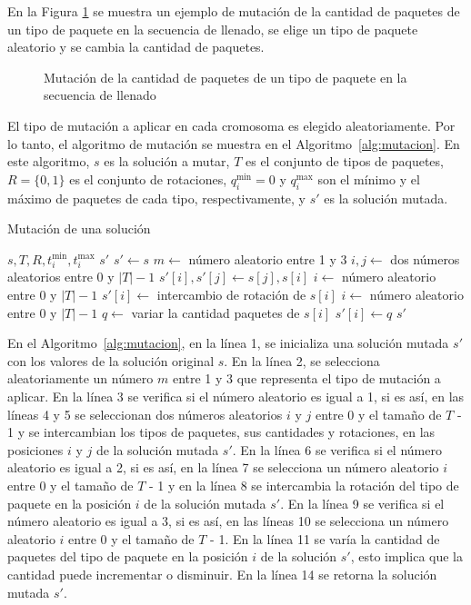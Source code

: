 \documentclass[openany]{article}
\begin{document}
En la Figura \ref{fig:mutacion_cantidad} se muestra un ejemplo de mutación de la cantidad de paquetes de un tipo de paquete en la secuencia de llenado, se elige un tipo de paquete aleatorio y se cambia la cantidad de paquetes.

\begin{figure}[H]
    \centering
    
    \caption{Mutación de la cantidad de paquetes de un tipo de paquete en la secuencia de llenado}
    \label{fig:mutacion_cantidad}
\end{figure}

El tipo de mutación a aplicar en cada cromosoma es elegido aleatoriamente. Por lo tanto, el algoritmo de mutación se muestra en el Algoritmo~\ref{alg:mutacion}. En este algoritmo, $s$ es la solución a mutar, $T$ es el conjunto de tipos de paquetes, $R=\{0, 1\}$ es el conjunto de rotaciones, $q_i^{\min} = 0$ y $q_i^{\max}$ son el mínimo y el máximo de paquetes de cada tipo, respectivamente, y $s'$ es la solución mutada.

\begin{algorithm}[H]
    \caption{Mutación de una solución}\label{alg:mutacion}
    \begin{algorithmic}[1]
        \Require $s, T, R, t_i^{\min}, t_i^{\max}$
        \Ensure $s'$
        \State $s' \leftarrow s$
        \State $m \leftarrow$ número aleatorio entre 1 y 3
        \State $i, j \leftarrow$ dos números aleatorios entre 0 y $|T|-1$
        \State $s'[i], s'[j] \leftarrow s[j], s[i]$
        \State $i \leftarrow$ número aleatorio entre 0 y $|T|-1$
        \State $s'[i] \leftarrow$ intercambio de rotación de $s[i]$
        \State $i \leftarrow$ número aleatorio entre 0 y $|T|-1$
        \State $q \leftarrow$ variar la cantidad paquetes de $s[i]$
        \State $s'[i] \leftarrow q$
        \EndIf
        \State \Return $s'$
    \end{algorithmic}
\end{algorithm}

En el Algoritmo~\ref{alg:mutacion}, en la línea 1, se inicializa una solución mutada $s'$ con los valores de la solución original $s$. En la línea 2, se selecciona aleatoriamente un número $m$ entre 1 y 3 que representa el tipo de mutación a aplicar. En la línea 3 se verifica si el número aleatorio es igual a 1, si es así, en las líneas 4 y 5 se seleccionan dos números aleatorios $i$ y $j$ entre 0 y el tamaño de $T$ - 1 y se intercambian los tipos de paquetes, sus cantidades y rotaciones, en las posiciones $i$ y $j$ de la solución mutada $s'$. En la línea 6 se verifica si el número aleatorio es igual a 2, si es así, en la línea 7 se selecciona un número aleatorio $i$ entre 0 y el tamaño de $T$ - 1 y en la línea 8 se intercambia la rotación del tipo de paquete en la posición $i$ de la solución mutada $s'$. En la línea 9 se verifica si el número aleatorio es igual a 3, si es así, en las líneas 10 se selecciona un número aleatorio $i$ entre 0 y el tamaño de $T$ - 1. En la línea 11 se varía la cantidad de paquetes del tipo de paquete en la posición $i$ de la solución $s'$, esto implica que la cantidad puede incrementar o disminuir. En la línea 14 se retorna la solución mutada $s'$.
\end{document}
